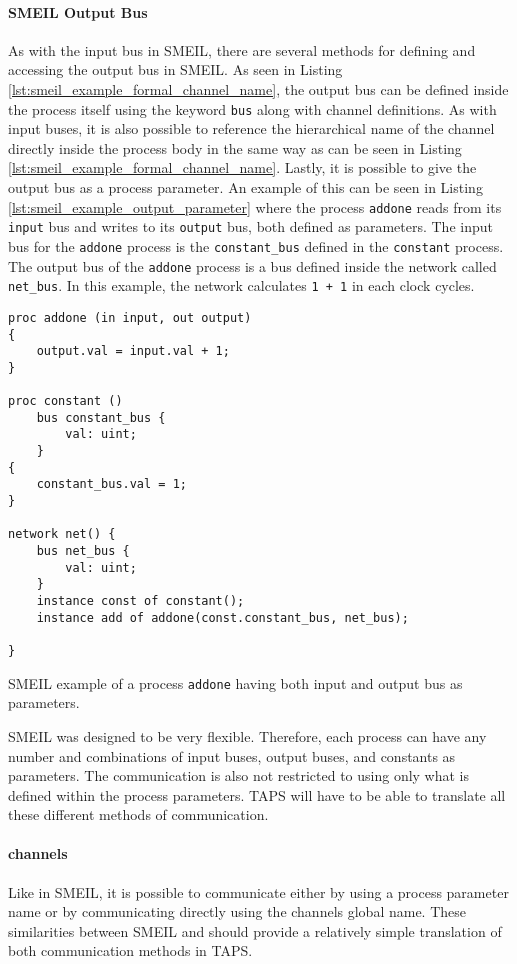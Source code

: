 \paragraph{SMEIL Output Bus}
As with the input bus in SMEIL, there are several methods for defining and accessing the output bus in SMEIL.
As seen in Listing \ref{lst:smeil_example_formal_channel_name}, the output bus can be defined inside the process itself using the keyword \texttt{bus} along with channel definitions. As with input buses, it is also possible to reference the hierarchical name of the channel directly inside the process body in the same way as can be seen in Listing \ref{lst:smeil_example_formal_channel_name}. Lastly, it is possible to give the output bus as a process parameter.
An example of this can be seen in Listing \ref{lst:smeil_example_output_parameter} where the process \texttt{addone} reads from its \texttt{input} bus and writes to its \texttt{output} bus, both defined as parameters. The input bus for the \texttt{addone} process is the \texttt{constant\_bus} defined in the \texttt{constant} process. The output bus of the \texttt{addone} process is a bus defined inside the network called \texttt{net\_bus}. In this example, the network calculates \texttt{1 + 1} in each clock cycles.
\begin{listing}
\begin{verbatim}
proc addone (in input, out output)
{
    output.val = input.val + 1;
}

proc constant ()
    bus constant_bus {
        val: uint;
    }
{
    constant_bus.val = 1;
}

network net() {
    bus net_bus {
        val: uint;
    }
    instance const of constant();
    instance add of addone(const.constant_bus, net_bus);

}
\end{verbatim}
\caption{SMEIL example of a process \texttt{addone} having both input and output bus as parameters.}
\label{lst:smeil_example_output_parameter}
\end{listing}

SMEIL was designed to be very flexible. Therefore, each process can have any number and combinations of input buses, output buses, and constants as parameters. The communication is also not restricted to using only what is defined within the process parameters. TAPS will have to be able to translate all these different methods of communication.

\paragraph{\cspm{} channels}
Like in SMEIL, it is possible to communicate either by using a process parameter name or by communicating directly using the channels global name. These similarities between SMEIL and \cspm{} should provide a relatively simple translation of both communication methods in TAPS.\\

